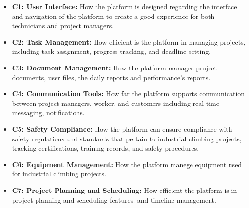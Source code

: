 \begin{itemize}
    \item \textbf{C1: User Interface:} How the platform is designed regarding the interface and navigation of the platform to create a good experience for both technicians and project managers.

    \item \textbf{C2: Task Management:} How efficient is the platform in managing projects, including task assignment, progress tracking, and deadline setting.

    \item \textbf{C3: Document Management:} How the platform manages project documents, user files, the daily reports and performance’s reports.
    \item \textbf{C4: Communication Tools:} How far the platform supports communication between project managers, worker, and customers including real-time messaging, notifications.

    \item \textbf{C5: Safety Compliance:} How the platform can ensure compliance with safety regulations and standards that pertain to industrial climbing projects, tracking certifications, training records, and safety procedures.
    \item \textbf{C6: Equipment Management:} How the platform manege equipment used for industrial climbing projects.
    \item \textbf{C7: Project Planning and Scheduling:} How efficient the platform is in project planning and scheduling features, and timeline management.
\end{itemize}

